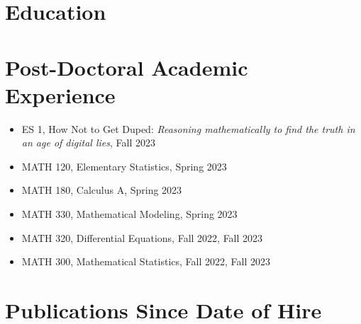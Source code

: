 \documentclass[11pt,a4paper]{moderncv}
\begin{document}
\maketitle
\vspace{-1cm}
\section{Education}
\section{Post-Doctoral Academic Experience}
\begin{itemize}[leftmargin=4cm]
	\item ES 1, How Not to Get Duped: \textit{Reasoning mathematically to find the truth in an age of digital lies}, Fall 2023
	\item MATH 120, Elementary Statistics, Spring 2023
	\item MATH 180, Calculus A, Spring 2023
	\item MATH 330, Mathematical Modeling, Spring 2023
	\item MATH 320, Differential Equations, Fall 2022, Fall 2023
	\item MATH 300, Mathematical Statistics, Fall 2022, Fall 2023
\end{itemize}



\section{Publications Since Date of Hire}
\end{document}
